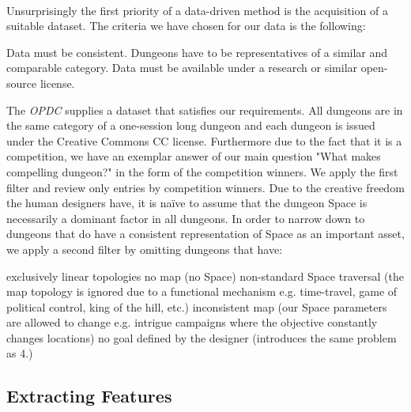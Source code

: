 \documentclass{UoYCSproject}
\begin{document}
\paragraph{}
Unsurprisingly the first priority of a data-driven method is the acquisition of a suitable dataset. The criteria we have chosen for our data is the following:
\begin{outline}[enumerate]
  \1 Data must be consistent. Dungeons have to be representatives of a similar and comparable category.
  \1 Data must be available under a research or similar open-source license.
\end{outline}
The \textit{OPDC} supplies a dataset that satisfies our requirements. All dungeons are in the same category of a one-session long dungeon and each dungeon is issued under the Creative Commons CC license. Furthermore due to the fact that it is a competition, we have an exemplar answer of our main question "What makes compelling dungeon?" in the form of the competition winners. We apply the first filter and review only entries by competition winners. Due to the creative freedom the human designers have, it is na\"{i}ve to assume that the dungeon Space is necessarily a dominant factor in all dungeons. In order to narrow down to dungeons that do have a consistent representation of Space as an important asset, we apply a second filter by omitting dungeons that have:
\begin{outline}[enumerate]
  \1 exclusively linear topologies
  \1 no map (no Space)
  \1 non-standard Space traversal (the map topology is ignored due to a functional mechanism e.g. time-travel, game of political control, king of the hill, etc.)
  \1 inconsistent map (our Space parameters are allowed to change e.g. intrigue campaigns where the objective constantly changes locations)
  \1 no goal defined by the designer (introduces the same problem as 4.)
\end{outline}

\subsection{Extracting Features}
\end{document}
